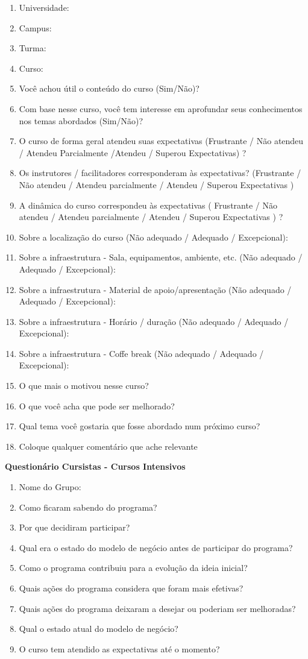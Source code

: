 \begin{apendicesenv}
\begin{enumerate}
\item Universidade:
\item Campus:
\item Turma:
\item Curso:
\item Você achou útil o conteúdo do curso (Sim/Não)?
\item Com base nesse curso, você tem interesse em aprofundar seus conhecimentos nos temas abordados (Sim/Não)?
\item O curso de forma geral atendeu suas expectativas (Frustrante / Não atendeu / Atendeu Parcialmente /Atendeu / Superou Expectativas) ?
\item Os instrutores / facilitadores corresponderam às expectativas? (Frustrante / Não atendeu / Atendeu parcialmente / Atendeu / Superou Expectativas )
\item A dinâmica do curso correspondeu às expectativas ( Frustrante / Não atendeu / Atendeu parcialmente / Atendeu / Superou Expectativas ) ? 
\item Sobre a localização do curso (Não adequado / Adequado / Excepcional):
\item Sobre a infraestrutura - Sala, equipamentos, ambiente, etc. (Não adequado / Adequado / Excepcional):
\item Sobre a infraestrutura - Material de apoio/apresentação (Não adequado / Adequado / Excepcional):
\item Sobre a infraestrutura - Horário / duração
(Não adequado / Adequado / Excepcional):
\item Sobre a infraestrutura - Coffe break
(Não adequado / Adequado / Excepcional):
\item O que mais o motivou nesse curso?
\item O que você acha que pode ser melhorado?
\item Qual tema você gostaria que fosse abordado num próximo curso?
\item Coloque qualquer comentário que ache relevante
\end{enumerate}

\clearpage

\textbf{Questionário Cursistas - Cursos Intensivos}

\begin{enumerate}
\item Nome do Grupo:
\item Como ficaram sabendo do programa?
\item Por que decidiram participar?
\item Qual era o estado do modelo de negócio antes de participar do programa?
\item Como o programa contribuiu para a evolução da ideia inicial?
\item Quais ações do programa considera que foram mais efetivas?
\item Quais ações do programa deixaram a desejar ou poderiam ser melhoradas?
\item Qual o estado atual do modelo de negócio?
\item O curso tem atendido as expectativas até o momento?


\end{enumerate}
\end{apendicesenv}
